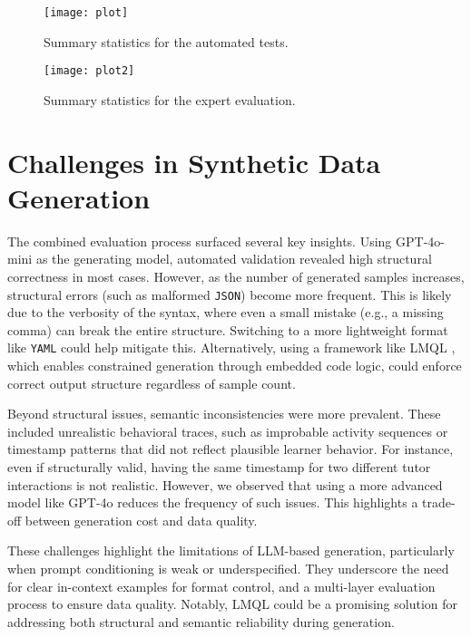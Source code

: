 \newpage

\begin{figure*}[h!]
	\texttt{[image: plot]}
  \caption{Summary statistics for the automated tests.}
  \label{fig:plot1}
\end{figure*}

\vspace{3cm}

\begin{figure*}[h!]
	\texttt{[image: plot2]}
  \caption{Summary statistics for the expert evaluation.}
  \label{fig:plot2}
\end{figure*}

\newpage

\section{Challenges in Synthetic Data Generation}

The combined evaluation process surfaced several key insights. Using GPT-4o-mini as the generating model, automated validation revealed high structural correctness in most cases. However, as the number of generated samples increases, structural errors (such as malformed \texttt{JSON}) become more frequent. This is likely due to the verbosity of the syntax, where even a small mistake (e.g., a missing comma) can break the entire structure. Switching to a more lightweight format like \texttt{YAML} could help mitigate this. Alternatively, using a framework like LMQL \cite{Beurer_Kellner_2023}, which enables constrained generation through embedded code logic, could enforce correct output structure regardless of sample count.

Beyond structural issues, semantic inconsistencies were more prevalent. These included unrealistic behavioral traces, such as improbable activity sequences or timestamp patterns that did not reflect plausible learner behavior. For instance, even if structurally valid, having the same timestamp for two different tutor interactions is not realistic. However, we observed that using a more advanced model like GPT-4o reduces the frequency of such issues. This highlights a trade-off between generation cost and data quality.

These challenges highlight the limitations of LLM-based generation, particularly when prompt conditioning is weak or underspecified. They underscore the need for clear in-context examples for format control, and a multi-layer evaluation process to ensure data quality. Notably, LMQL could be a promising solution for addressing both structural and semantic reliability during generation.
